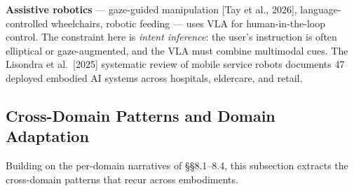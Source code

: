\textbf{Assistive robotics} --- gaze-guided manipulation {[}Tay et al., 2026{]}, language-controlled wheelchairs, robotic feeding --- uses VLA for human-in-the-loop control. The constraint here is \emph{intent inference}: the user's instruction is often elliptical or gaze-augmented, and the VLA must combine multimodal cues. The Lisondra et al.~{[}2025{]} systematic review of mobile service robots documents 47 deployed embodied AI systems across hospitals, eldercare, and retail.

\subsection{Cross-Domain Patterns and Domain Adaptation}\label{cross-domain-patterns-and-domain-adaptation}

Building on the per-domain narratives of §§8.1--8.4, this subsection extracts the cross-domain patterns that recur across embodiments.

